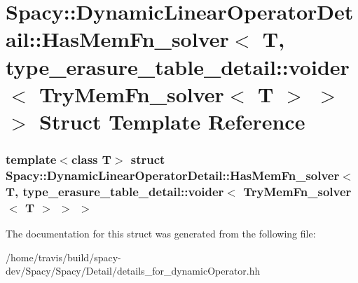 \hypertarget{structSpacy_1_1DynamicLinearOperatorDetail_1_1HasMemFn__solver_3_01T_00_01type__erasure__table__d20ea9f175d212b086d45cc1a3f83e80}{\section{\-Spacy\-:\-:\-Dynamic\-Linear\-Operator\-Detail\-:\-:\-Has\-Mem\-Fn\-\_\-solver$<$ \-T, type\-\_\-erasure\-\_\-table\-\_\-detail\-:\-:voider$<$ \-Try\-Mem\-Fn\-\_\-solver$<$ \-T $>$ $>$ $>$ \-Struct \-Template \-Reference}
\label{structSpacy_1_1DynamicLinearOperatorDetail_1_1HasMemFn__solver_3_01T_00_01type__erasure__table__d20ea9f175d212b086d45cc1a3f83e80}
}
\subsubsection*{template$<$class T$>$ struct Spacy\-::\-Dynamic\-Linear\-Operator\-Detail\-::\-Has\-Mem\-Fn\-\_\-solver$<$ T, type\-\_\-erasure\-\_\-table\-\_\-detail\-::voider$<$ Try\-Mem\-Fn\-\_\-solver$<$ T $>$ $>$ $>$}



\-The documentation for this struct was generated from the following file\-:\begin{DoxyCompactItemize}
\item 
/home/travis/build/spacy-\/dev/\-Spacy/\-Spacy/\-Detail/details\-\_\-for\-\_\-dynamic\-Operator.\-hh\end{DoxyCompactItemize}
